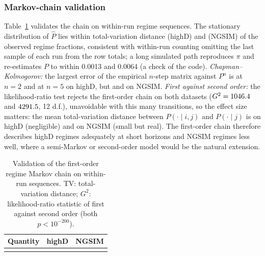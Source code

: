 \documentclass[10pt,a4paper]{article}
\numberwithin{equation}{section}
\begin{document}
\subsubsection{Markov-chain validation}
Table~\ref{tab:markovval} validates the chain on within-run regime sequences. The stationary distribution of $\hat P$ lies within total-variation distance \hdStatTV{} (highD) and \ngStatTV{} (NGSIM) of the observed regime fractions, consistent with within-run counting omitting the last sample of each run from the row totals; a long simulated path reproduces $\pi$ and re-estimates $P$ to within 0.0013 and 0.0064 (a check of the code).
\emph{Chapman--Kolmogorov:} the largest error of the empirical $n$-step matrix against $P^n$ is \hdCKtwo{} at $n=2$ and \hdCKfive{} at $n=5$ on highD, but \ngCKtwo{} and \ngCKfive{} on NGSIM. \emph{First against second order:} the likelihood-ratio test rejects the first-order chain on both datasets ($G^2=1046.4$ and $4291.5$, 12 d.f.), unavoidable with this many transitions, so the effect size matters: the mean total-variation distance between $P(\cdot\mid i,j)$ and $P(\cdot\mid j)$ is
\hdSecondTV{} on highD (negligible) and \ngSecondTV{} on NGSIM (small but real). The first-order chain therefore describes highD regimes adequately at short horizons and NGSIM regimes less well, where a semi-Markov or second-order model would be the natural extension.

\begin{table}[H]
\centering\small
\caption{Validation of the first-order regime Markov chain on within-run sequences. TV: total-variation distance; $G^2$: likelihood-ratio statistic of first against second order (both $p<10^{-200}$).}
\label{tab:markovval}
\begin{tabular}{@{}lrr@{}}
\toprule
Quantity & highD & NGSIM \\
\midrule
\\
\bottomrule
\end{tabular}
\end{table}
\end{document}
